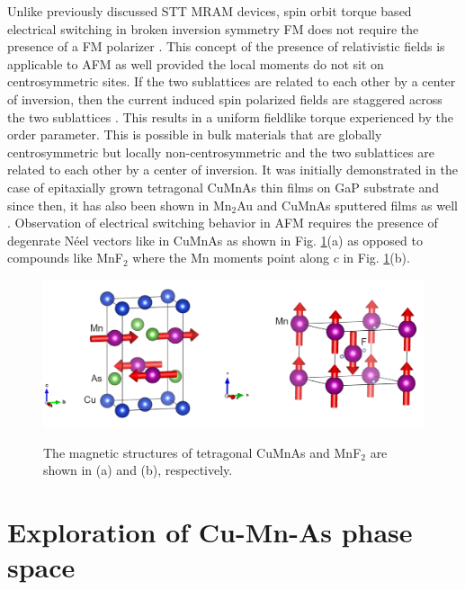 \documentclass[11pt,edeposit,draftthesis]{uiucthesis2020}
\begin{document}
\begin{mainmatter}
Unlike previously discussed STT MRAM devices, spin orbit torque based electrical switching in broken inversion symmetry FM does not require the presence of a FM polarizer \cite{Manchon2008}. This concept of the presence of relativistic fields is applicable to AFM as well provided the local moments do not sit on centrosymmetric sites. If the two sublattices are related to each other by a center of inversion, then the current induced spin polarized fields are staggered across the two sublattices \cite{Zelezny2014,Zelezny2017,Wadley2016}. This results in a uniform fieldlike torque experienced by the order parameter. This is possible in bulk materials that are globally centrosymmetric but locally non-centrosymmetric and the two sublattices are related to each other by a center of inversion. It was initially demonstrated in the case of epitaxially grown tetragonal CuMnAs thin films on GaP substrate \cite{Wadley2016} and since then, it has also been shown in Mn$_2$Au and CuMnAs sputtered films as well \cite{Meinert2018,Matalla-Wagner2019}. Observation of electrical switching behavior in AFM requires the presence of degenrate N\'eel vectors like in CuMnAs as shown in Fig. \ref{fig:tet-CuMnAs}(a) as opposed to compounds like MnF$_2$ where the Mn moments point along $c$ in Fig. \ref{fig:tet-CuMnAs}(b).


\begin{figure}
\centering\includegraphics[width=\columnwidth]{figures/ch1/CuMnAs-MnF2.png} \\
\caption{\label{fig:tet-CuMnAs}
The magnetic structures of tetragonal CuMnAs and MnF$_2$ are shown in (a) and (b), respectively.
}
\end{figure}

\section{Exploration of Cu-Mn-As phase space}


\end{mainmatter}
\end{document}
